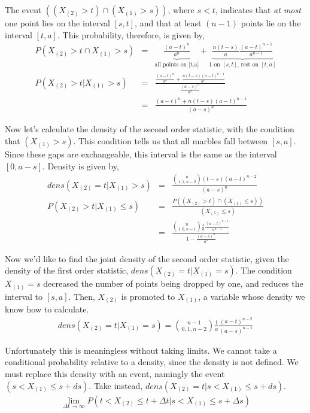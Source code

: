 The event $((X_{(2)}>t)\cap(X_{(1)}>s))$, where $s<t$, indicates that {\em at most} one point lies on the interval $[s,t]$, and that at least $(n-1)$ points lie on the interval $[t,a]$.  This probability, therefore, is given by,
\begin{eqnarray*}
P(X_{(2)}>t\cap X_{(1)}>s)&=&\underbrace{\frac{(a-t)^n}{a^n}}_{\mbox{all points on [t,a]}}+\underbrace{\frac{n(t-s)}{a}\frac{(a-t)^{n-1}}{a^{n-1}}}_{\mbox{1 on $[s,t]$, rest on $[t,a]$}} \\
P(X_{(2)}>t|X_{(1)}>s)&=&\frac{\frac{(a-t)^n}{a^n}+\frac{n(t-s)(a-t)^{n-1}}{a^n}}{\frac{(a-s)^n}{a^n}}\\
                      &=&\frac{(a-t)^n+n(t-s)(a-t)^{n-1}}{(a-s)^n}
\end{eqnarray*}

Now let's calculate the density of the second order statistic, with the condition that $(X_{(1)}>s)$.  This condition tells us that all marbles fall between $[s,a]$.  Since these gaps are exchangeable, this interval is the same as the interval $[0,a-s]$.  Density is given by,
\begin{eqnarray*}
dens(X_{(2)}=t|X_{(1)}>s)&=&\frac{{n\choose{1,1,n-2}}(t-s)(a-t)^{n-2}}{(a-s)^n}\\
P(X_{(2)}>t|X_{(1)}\leq s)&=&\frac{P((X_{(2)}>t)\cap(X_{(1)}\leq s))}{(X_{(1)}\leq s)}\\
                          &=&\frac{{n\choose{1,0,n-1}}\frac{s}{a}\frac{(a-t)^{n-1}}{a^{n-1}}}{1-\frac{(a-s)^n}{a^n}}
\end{eqnarray*}

Now we'd like to find the joint density of the second order statistic, given the density of the first order statistic, $dens(X_{(2)}=t|X_{(1)}=s)$.  The condition $X_{(1)}=s$ decreased the number of points being dropped by one, and reduces the interval to $[s,a]$.  Then, $X_{(2)}$ is promoted to $X_{(1)}$, a variable whose density we know how to calculate.  
\begin{eqnarray*}
dens(X_{(2)}=t|X_{(1)}=s)={n-1\choose{0,1,n-2}}\frac{1}{a}\frac{(a-t)^{n-2}}{(a-s)^{n-1}}
\end{eqnarray*}

Unfortunately this is meaningless without taking limits.  We cannot take a conditional probability relative to a density, since the density is not defined.  We must replace this density with an event, namingly the event $(s<X_{(1)}\leq s+ds)$.  Take instead, $dens(X_{(2)}=t|s<X_{(1)}\leq s+ds)$.
\begin{eqnarray*}
\lim_{\Delta t\to\infty}P(t<X_{(2)}\leq t+\Delta t|s<X_{(1)}\leq s+\Delta s)
\end{eqnarray*}

